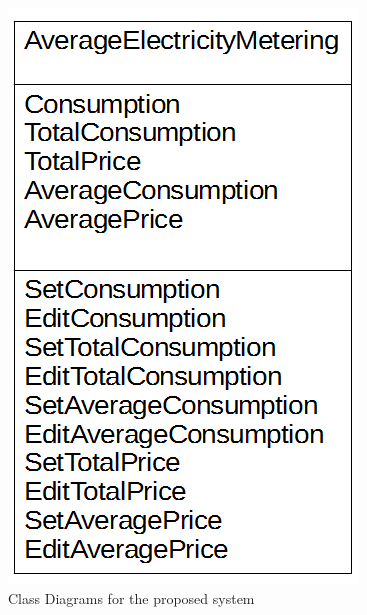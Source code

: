 \begin{figure}[H]
    \includegraphics[width=\textwidth]{./AverageElectricityMetering.png}
    \caption{Class Diagrams for the proposed system} \label{fig:AverageElectricityMetering Class Diagram}
\end{figure}
